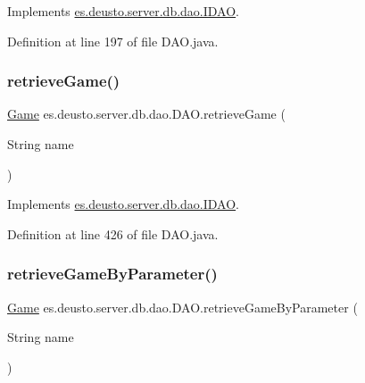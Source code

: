 Implements \hyperlink{interfacees_1_1deusto_1_1server_1_1db_1_1dao_1_1_i_d_a_o_a5bab06408d3191e9bfd553384e65e7a4}{es.\+deusto.\+server.\+db.\+dao.\+I\+D\+AO}.



Definition at line 197 of file D\+A\+O.\+java.

\mbox{\label{classes_1_1deusto_1_1server_1_1db_1_1dao_1_1_d_a_o_ac94a91d3e5aeeb98fc12f087532b3506}} 
\subsubsection{\texorpdfstring{retrieve\+Game()}{retrieveGame()}}
{\footnotesize\ttfamily \hyperlink{classes_1_1deusto_1_1server_1_1db_1_1data_1_1_game}{Game} es.\+deusto.\+server.\+db.\+dao.\+D\+A\+O.\+retrieve\+Game (\begin{DoxyParamCaption}\item[{String}]{name }\end{DoxyParamCaption})}



Implements \hyperlink{interfacees_1_1deusto_1_1server_1_1db_1_1dao_1_1_i_d_a_o_a30558c19c086ac0ffff6796a8ae208fb}{es.\+deusto.\+server.\+db.\+dao.\+I\+D\+AO}.



Definition at line 426 of file D\+A\+O.\+java.

\mbox{\label{classes_1_1deusto_1_1server_1_1db_1_1dao_1_1_d_a_o_a5ac74c9e59db9f20336d6e68d77c6ed8}} 
\subsubsection{\texorpdfstring{retrieve\+Game\+By\+Parameter()}{retrieveGameByParameter()}}
{\footnotesize\ttfamily \hyperlink{classes_1_1deusto_1_1server_1_1db_1_1data_1_1_game}{Game} es.\+deusto.\+server.\+db.\+dao.\+D\+A\+O.\+retrieve\+Game\+By\+Parameter (\begin{DoxyParamCaption}\item[{String}]{name }\end{DoxyParamCaption})}



